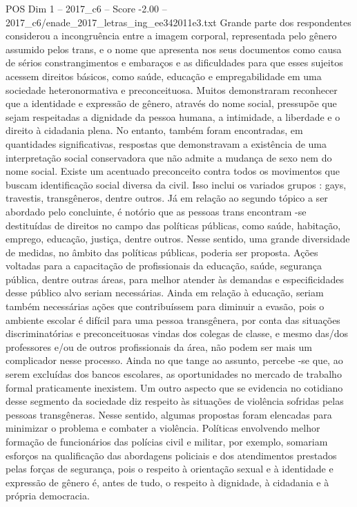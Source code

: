 \begin{textsample}{POS Dim 1 – 2017\_c6 – Score -2.00 – 2017\_c6/enade\_2017\_letras\_ing\_ee342011e3.txt}
Grande parte dos respondentes considerou a incongruência entre a imagem corporal, representada pelo gênero assumido pelos trans, e o nome que apresenta nos seus documentos como causa de sérios constrangimentos e embaraços e as dificuldades para que esses sujeitos acessem direitos básicos, como saúde, educação e empregabilidade em uma sociedade heteronormativa e preconceituosa.
Muitos demonstraram reconhecer que a identidade e expressão de gênero, através do nome social, pressupõe que sejam respeitadas a dignidade da pessoa humana, a intimidade, a liberdade e o direito à cidadania plena.
No entanto, também foram encontradas, em quantidades significativas, respostas que demonstravam a existência de uma interpretação social conservadora que não admite a mudança de sexo nem do nome social.
Existe um acentuado preconceito contra todos os movimentos que buscam identificação social diversa da civil.
Isso inclui os variados grupos : gays, travestis, transgêneros, dentre outros.
Já em relação ao segundo tópico a ser abordado pelo concluinte, é notório que as pessoas trans encontram -se destituídas de direitos no campo das políticas públicas, como saúde, habitação, emprego, educação, justiça, dentre outros.
Nesse sentido, uma grande diversidade de medidas, no âmbito das políticas públicas, poderia ser proposta.
Ações voltadas para a capacitação de profissionais da educação, saúde, segurança pública, dentre outras áreas, para melhor atender às demandas e especificidades desse público alvo seriam necessárias.
Ainda em relação à educação, seriam também necessárias ações que contribuíssem para diminuir a evasão, pois o ambiente escolar é difícil para uma pessoa transgênera, por conta das situações discriminatórias e preconceituosas vindas dos colegas de classe, e mesmo das/dos professores e/ou de outros profissionais da área, não podem ser mais um complicador nesse processo.
Ainda no que tange ao assunto, percebe -se que, ao serem excluídas dos bancos escolares, as oportunidades no mercado de trabalho formal praticamente inexistem.
Um outro aspecto que se evidencia no cotidiano desse segmento da sociedade diz respeito às situações de violência sofridas pelas pessoas transgêneras.
Nesse sentido, algumas propostas foram elencadas para minimizar o problema e combater a violência.
Políticas envolvendo melhor formação de funcionários das polícias civil e militar, por exemplo, somariam esforços na qualificação das abordagens policiais e dos atendimentos prestados pelas forças de segurança, pois o respeito à orientação sexual e à identidade e expressão de gênero é, antes de tudo, o respeito à dignidade, à cidadania e à própria democracia.

\end{textsample}
